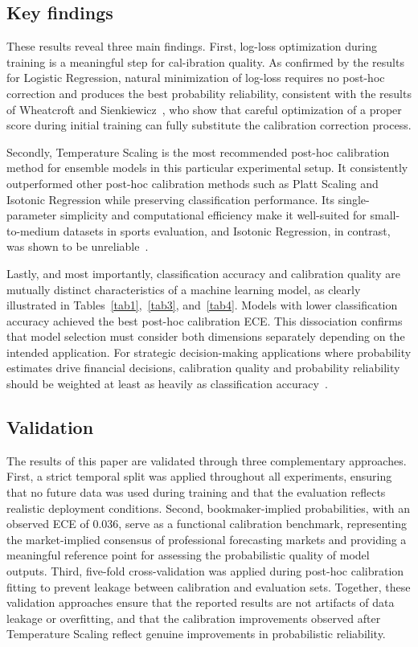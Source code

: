 \documentclass[conference]{IEEEtran}
\begin{document}
\subsection{Key findings}
These results reveal three main findings. First, log-loss
optimization during training is a meaningful step for cal-ibration quality. As confirmed by the results for Logistic
Regression, natural minimization of log-loss requires no post-hoc correction and produces the best probability reliability,
consistent with the results of Wheatcroft and Sienkiewicz~\cite{b6},
who show that careful optimization of a proper score during
initial training can fully substitute the calibration correction
process.

Secondly, Temperature Scaling is the most recommended
post-hoc calibration method for ensemble models in this
particular experimental setup. It consistently outperformed
other post-hoc calibration methods such as Platt Scaling and
Isotonic Regression while preserving classification performance.
Its single-parameter simplicity and computational efficiency
make it well-suited for small-to-medium datasets in sports
evaluation, and Isotonic Regression, in contrast, was shown
to be unreliable~\cite{b12}.

Lastly, and most importantly, classification accuracy and
calibration quality are mutually distinct characteristics of
a machine learning model, as clearly illustrated in
Tables~\ref{tab1},~\ref{tab3}, and~\ref{tab4}. Models with
lower classification accuracy achieved the best post-hoc
calibration ECE. This dissociation confirms that model
selection must consider both dimensions separately depending
on the intended application. For strategic decision-making
applications where probability estimates drive financial
decisions, calibration quality and probability reliability
should be weighted at least as heavily as classification
accuracy~\cite{b6}\cite{b11}.

\subsection{Validation}
The results of this paper are validated through three
complementary approaches. First, a strict temporal split
was applied throughout all experiments, ensuring that no
future data was used during training and that the evaluation
reflects realistic deployment conditions. Second,
bookmaker-implied probabilities, with an observed ECE of
0.036, serve as a functional calibration benchmark,
representing the market-implied consensus of professional
forecasting markets and providing a meaningful reference
point for assessing the probabilistic quality of model
outputs. Third, five-fold cross-validation was applied
during post-hoc calibration fitting to prevent leakage
between calibration and evaluation sets. Together, these
validation approaches ensure that the reported results
are not artifacts of data leakage or overfitting, and
that the calibration improvements observed after
Temperature Scaling reflect genuine improvements in
probabilistic reliability.
\end{document}
